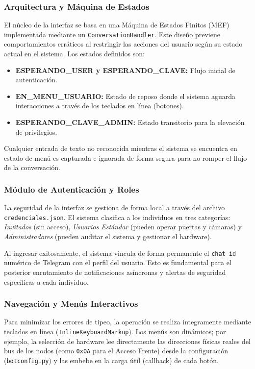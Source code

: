 \subsubsection{Arquitectura y Máquina de Estados}
El núcleo de la interfaz se basa en una Máquina de Estados Finitos (MEF) implementada mediante un \texttt{ConversationHandler}. Este diseño previene comportamientos erráticos al restringir las acciones del usuario según su estado actual en el sistema. Los estados definidos son:
\begin{itemize}
    \item \textbf{ESPERANDO\_USER y ESPERANDO\_CLAVE:} Flujo inicial de autenticación.
    \item \textbf{EN\_MENU\_USUARIO:} Estado de reposo donde el sistema aguarda interacciones a través de los teclados en línea (botones).
    \item \textbf{ESPERANDO\_CLAVE\_ADMIN:} Estado transitorio para la elevación de privilegios.
\end{itemize}
Cualquier entrada de texto no reconocida mientras el sistema se encuentra en estado de menú es capturada e ignorada de forma segura para no romper el flujo de la conversación.

\subsubsection{Módulo de Autenticación y Roles}
La seguridad de la interfaz se gestiona de forma local a través del archivo \texttt{credenciales.json}. El sistema clasifica a los individuos en tres categorías: \textit{Invitados} (sin acceso), \textit{Usuarios Estándar} (pueden operar puertas y cámaras) y \textit{Administradores} (pueden auditar el sistema y gestionar el hardware). 

Al ingresar exitosamente, el sistema vincula de forma permanente el \texttt{chat\_id} numérico de Telegram con el perfil del usuario. Esto es fundamental para el posterior enrutamiento de notificaciones asíncronas y alertas de seguridad específicas a cada individuo.

\subsubsection{Navegación y Menús Interactivos}
Para minimizar los errores de tipeo, la operación se realiza íntegramente mediante teclados en línea (\texttt{InlineKeyboardMarkup}). Los menús son dinámicos; por ejemplo, la selección de hardware lee directamente las direcciones físicas reales del bus de los nodos (como \texttt{0x0A} para el Acceso Frente) desde la configuración (\texttt{botconfig.py}) y las embebe en la carga útil (callback) de cada botón. 

